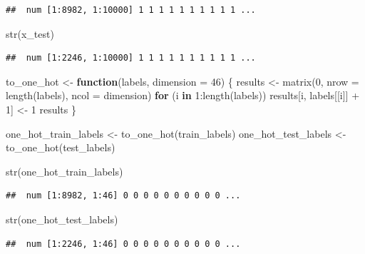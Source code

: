 \documentclass[]{article}
\newenvironment{Shaded}{\begin{snugshade}}{\end{snugshade}}
\newcommand{\AttributeTok}[1]{\textcolor[rgb]{0.77,0.63,0.00}{#1}}
\newcommand{\ControlFlowTok}[1]{\textcolor[rgb]{0.13,0.29,0.53}{\textbf{#1}}}
\newcommand{\DecValTok}[1]{\textcolor[rgb]{0.00,0.00,0.81}{#1}}
\newcommand{\FunctionTok}[1]{\textcolor[rgb]{0.00,0.00,0.00}{#1}}
\newcommand{\NormalTok}[1]{#1}
\newcommand{\OtherTok}[1]{\textcolor[rgb]{0.56,0.35,0.01}{#1}}
\newcommand{\SpecialCharTok}[1]{\textcolor[rgb]{0.00,0.00,0.00}{#1}}
\begin{document}
\begin{verbatim}
##  num [1:8982, 1:10000] 1 1 1 1 1 1 1 1 1 1 ...
\end{verbatim}

\begin{Shaded}
\begin{Highlighting}[]
\FunctionTok{str}\NormalTok{(x\_test)}
\end{Highlighting}
\end{Shaded}

\begin{verbatim}
##  num [1:2246, 1:10000] 1 1 1 1 1 1 1 1 1 1 ...
\end{verbatim}

\begin{Shaded}
\begin{Highlighting}[]
\NormalTok{to\_one\_hot }\OtherTok{\textless{}{-}} \ControlFlowTok{function}\NormalTok{(labels, }\AttributeTok{dimension =} \DecValTok{46}\NormalTok{) \{}
\NormalTok{  results }\OtherTok{\textless{}{-}} \FunctionTok{matrix}\NormalTok{(}\DecValTok{0}\NormalTok{, }\AttributeTok{nrow =} \FunctionTok{length}\NormalTok{(labels), }\AttributeTok{ncol =}\NormalTok{ dimension) }
  \ControlFlowTok{for}\NormalTok{ (i }\ControlFlowTok{in} \DecValTok{1}\SpecialCharTok{:}\FunctionTok{length}\NormalTok{(labels))}
\NormalTok{    results[i, labels[[i]] }\SpecialCharTok{+} \DecValTok{1}\NormalTok{] }\OtherTok{\textless{}{-}} \DecValTok{1}
\NormalTok{  results}
\NormalTok{\}}

\NormalTok{one\_hot\_train\_labels }\OtherTok{\textless{}{-}} \FunctionTok{to\_one\_hot}\NormalTok{(train\_labels)}
\NormalTok{one\_hot\_test\_labels }\OtherTok{\textless{}{-}} \FunctionTok{to\_one\_hot}\NormalTok{(test\_labels)}

\FunctionTok{str}\NormalTok{(one\_hot\_train\_labels)}
\end{Highlighting}
\end{Shaded}

\begin{verbatim}
##  num [1:8982, 1:46] 0 0 0 0 0 0 0 0 0 0 ...
\end{verbatim}

\begin{Shaded}
\begin{Highlighting}[]
\FunctionTok{str}\NormalTok{(one\_hot\_test\_labels)}
\end{Highlighting}
\end{Shaded}

\begin{verbatim}
##  num [1:2246, 1:46] 0 0 0 0 0 0 0 0 0 0 ...
\end{verbatim}
\end{document}
